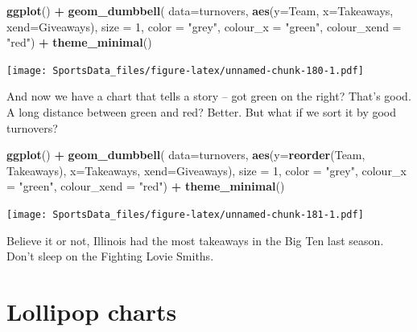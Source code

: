 \documentclass[
]{book}
\newenvironment{Shaded}{\begin{snugshade}}{\end{snugshade}}
\newcommand{\DataTypeTok}[1]{\textcolor[rgb]{0.13,0.29,0.53}{#1}}
\newcommand{\DecValTok}[1]{\textcolor[rgb]{0.00,0.00,0.81}{#1}}
\newcommand{\KeywordTok}[1]{\textcolor[rgb]{0.13,0.29,0.53}{\textbf{#1}}}
\newcommand{\NormalTok}[1]{#1}
\newcommand{\OperatorTok}[1]{\textcolor[rgb]{0.81,0.36,0.00}{\textbf{#1}}}
\newcommand{\StringTok}[1]{\textcolor[rgb]{0.31,0.60,0.02}{#1}}
\begin{document}
\begin{Shaded}
\begin{Highlighting}[]
\KeywordTok{ggplot}\NormalTok{() }\OperatorTok{+}\StringTok{ }
\StringTok{  }\KeywordTok{geom_dumbbell}\NormalTok{(}
    \DataTypeTok{data=}\NormalTok{turnovers, }
    \KeywordTok{aes}\NormalTok{(}\DataTypeTok{y=}\NormalTok{Team, }\DataTypeTok{x=}\NormalTok{Takeaways, }\DataTypeTok{xend=}\NormalTok{Giveaways),}
    \DataTypeTok{size =} \DecValTok{1}\NormalTok{,}
    \DataTypeTok{color =} \StringTok{"grey"}\NormalTok{,}
    \DataTypeTok{colour_x =} \StringTok{"green"}\NormalTok{,}
    \DataTypeTok{colour_xend =} \StringTok{"red"}\NormalTok{) }\OperatorTok{+}\StringTok{ }
\StringTok{  }\KeywordTok{theme_minimal}\NormalTok{()}
\end{Highlighting}
\end{Shaded}

\texttt{[image: SportsData\_files/figure-latex/unnamed-chunk-180-1.pdf]}

And now we have a chart that tells a story -- got green on the right? That's good. A long distance between green and red? Better. But what if we sort it by good turnovers?

\begin{Shaded}
\begin{Highlighting}[]
\KeywordTok{ggplot}\NormalTok{() }\OperatorTok{+}\StringTok{ }
\StringTok{  }\KeywordTok{geom_dumbbell}\NormalTok{(}
    \DataTypeTok{data=}\NormalTok{turnovers, }
    \KeywordTok{aes}\NormalTok{(}\DataTypeTok{y=}\KeywordTok{reorder}\NormalTok{(Team, Takeaways), }\DataTypeTok{x=}\NormalTok{Takeaways, }\DataTypeTok{xend=}\NormalTok{Giveaways),}
    \DataTypeTok{size =} \DecValTok{1}\NormalTok{,}
    \DataTypeTok{color =} \StringTok{"grey"}\NormalTok{,}
    \DataTypeTok{colour_x =} \StringTok{"green"}\NormalTok{,}
    \DataTypeTok{colour_xend =} \StringTok{"red"}\NormalTok{) }\OperatorTok{+}\StringTok{ }
\StringTok{  }\KeywordTok{theme_minimal}\NormalTok{()}
\end{Highlighting}
\end{Shaded}

\texttt{[image: SportsData\_files/figure-latex/unnamed-chunk-181-1.pdf]}

Believe it or not, Illinois had the most takeaways in the Big Ten last season. Don't sleep on the Fighting Lovie Smiths.

\hypertarget{lollipop-charts}{%
\section{Lollipop charts}\label{lollipop-charts}}
\end{document}
